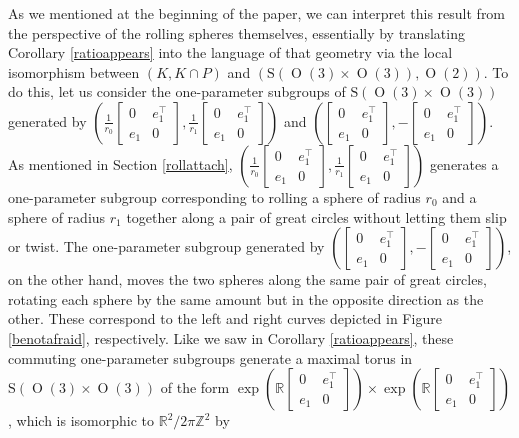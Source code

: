 \documentclass[12pt,a4paper]{amsart}
\theoremstyle{definition}
\DeclareMathOperator{\Orth}{O}
\begin{document}
As we mentioned at the beginning of the paper, we can interpret this result from the perspective of the rolling spheres themselves, essentially by translating Corollary \ref{ratioappears} into the language of that geometry via the local isomorphism between $(K,K\cap P)$ and $(\mathrm{S}(\Orth(3)\times\Orth(3)),\Orth(2))$. To do this, let us consider the one-parameter subgroups of $\mathrm{S}(\Orth(3)\times\Orth(3))$ generated by $(\tfrac{1}{r_0}[\begin{smallmatrix}0 & e_1^\top \\ e_1 & 0\end{smallmatrix}],\tfrac{1}{r_1}[\begin{smallmatrix}0 & e_1^\top \\ e_1 & 0\end{smallmatrix}])$ and $([\begin{smallmatrix}0 & e_1^\top \\ e_1 & 0\end{smallmatrix}],-[\begin{smallmatrix}0 & e_1^\top \\ e_1 & 0\end{smallmatrix}])$. As mentioned in Section \ref{rollattach}, $(\tfrac{1}{r_0}[\begin{smallmatrix}0 & e_1^\top \\ e_1 & 0\end{smallmatrix}],\tfrac{1}{r_1}[\begin{smallmatrix}0 & e_1^\top \\ e_1 & 0\end{smallmatrix}])$ generates a one-parameter subgroup corresponding to rolling a sphere of radius $r_0$ and a sphere of radius $r_1$ together along a pair of great circles without letting them slip or twist. The one-parameter subgroup generated by $([\begin{smallmatrix}0 & e_1^\top \\ e_1 & 0\end{smallmatrix}],-[\begin{smallmatrix}0 & e_1^\top \\ e_1 & 0\end{smallmatrix}])$, on the other hand, moves the two spheres along the same pair of great circles, rotating each sphere by the same amount but in the opposite direction as the other. These correspond to the left and right curves depicted in Figure \ref{benotafraid}, respectively. Like we saw in Corollary \ref{ratioappears}, these commuting one-parameter subgroups generate a maximal torus in $\mathrm{S}(\Orth(3)\times\Orth(3))$ of the form $\exp(\mathbb{R}[\begin{smallmatrix}0 & e_1^\top \\ e_1 & 0\end{smallmatrix}])\times\exp(\mathbb{R}[\begin{smallmatrix}0 & e_1^\top \\ e_1 & 0\end{smallmatrix}])$, which is isomorphic to $\mathbb{R}^2/2\pi\mathbb{Z}^2$ by
\end{document}
